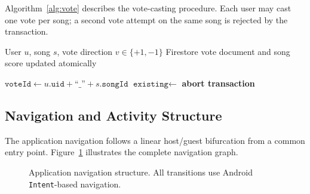 \documentclass[pdflatex,sn-mathphys-num,iicol]{sn-jnl}
\theoremstyle{thmstyleone}%
\theoremstyle{thmstyletwo}%
\theoremstyle{thmstylethree}%
\begin{document}
Algorithm~\ref{alg:vote} describes the vote-casting procedure. Each user may cast
one vote per song; a second vote attempt on the same song is rejected by the
transaction.

\begin{algorithm}
\caption{Vote Casting Procedure}
\label{alg:vote}
\begin{algorithmic}[1]
\Require User $u$, song $s$, vote direction $v \in \{+1, -1\}$
\Ensure Firestore vote document and song score updated atomically

    \State $\texttt{voteId} \gets u.\texttt{uid} + \text{``\_''} + s.\texttt{songId}$
    \State $\texttt{existing} \gets$ 
        \State {}
        \State {}
        \State {}
    \Else
        \State \textbf{abort transaction}
    \EndIf
\EndFunction
\end{algorithmic}
\end{algorithm}

\subsection{Navigation and Activity Structure}

The application navigation follows a linear host/guest bifurcation from a common entry
point. Figure~\ref{fig:nav} illustrates the complete navigation graph.

\begin{figure}[ht]
\centering
{}
\caption{Application navigation structure. All transitions use Android
\texttt{Intent}-based navigation.}
\label{fig:nav}
\end{figure}
\end{document}
